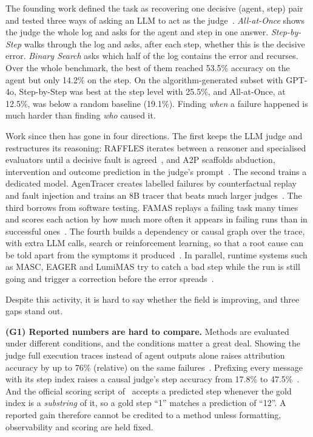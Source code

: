 \documentclass[conference]{IEEEtran}
\begin{document}
The founding work defined the task as recovering one decisive (agent, step) pair and tested three ways of asking an LLM to act as the judge~\cite{zhang2025whowhen}. \emph{All-at-Once} shows the judge the whole log and asks for the agent and step in one answer. \emph{Step-by-Step} walks through the log and asks, after each step, whether this is the decisive error. \emph{Binary Search} asks which half of the log contains the error and recurses. Over the whole benchmark, the best of them reached 53.5\% accuracy on the agent but only 14.2\% on the step. On the algorithm-generated subset with GPT-4o, Step-by-Step was best at the step level with 25.5\%, and All-at-Once, at 12.5\%, was below a random baseline (19.1\%). Finding \emph{when} a failure happened is much harder than finding \emph{who} caused it.

Work since then has gone in four directions. The first keeps the LLM judge and restructures its reasoning: RAFFLES iterates between a reasoner and specialised evaluators until a decisive fault is agreed~\cite{zhu2026raffles}, and A2P scaffolds abduction, intervention and outcome prediction in the judge's prompt~\cite{west2025a2p}. The second trains a dedicated model. AgenTracer creates labelled failures by counterfactual replay and fault injection and trains an 8B tracer that beats much larger judges~\cite{zhang2026agentracer}. The third borrows from software testing. FAMAS replays a failing task many times and scores each action by how much more often it appears in failing runs than in successful ones~\cite{ge2026spectrum,wong2016survey}. The fourth builds a dependency or causal graph over the trace, with extra LLM calls, search or reinforcement learning, so that a root cause can be told apart from the symptoms it produced~\cite{zhang2025graphtracer,wang2026chief,rafi2026falat,ma2025causal}. In parallel, runtime systems such as MASC, EAGER and LumiMAS try to catch a bad step while the run is still going and trigger a correction before the error spreads~\cite{shen2026masc,zhang2026eager,solomon2026lumimas}.

Despite this activity, it is hard to say whether the field is improving, and three gaps stand out.

\textbf{(G1) Reported numbers are hard to compare.} Methods are evaluated under different conditions, and the conditions matter a great deal. Showing the judge full execution traces instead of agent outputs alone raises attribution accuracy by up to 76\% (relative) on the same failures~\cite{chen2026elephant}. Prefixing every message with its step index raises a causal judge's step accuracy from 17.8\% to 47.5\%~\cite{west2025a2p}. And the official scoring script of~\cite{zhang2025whowhen} accepts a predicted step whenever the gold index is a \emph{substring} of it, so a gold step ``1'' matches a prediction of ``12''. A reported gain therefore cannot be credited to a method unless formatting, observability and scoring are held fixed.
\end{document}
